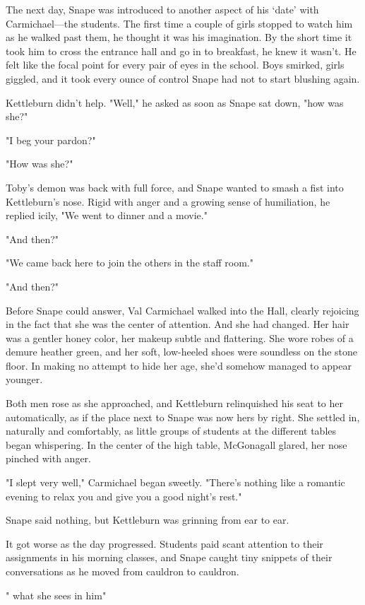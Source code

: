 The next day, Snape was introduced to another aspect of his `date' with Carmichael—the students. The first time a couple of girls stopped to watch him as he walked past them, he thought it was his imagination. By the short time it took him to cross the entrance hall and go in to breakfast, he knew it wasn't. He felt like the focal point for every pair of eyes in the school. Boys smirked, girls giggled, and it took every ounce of control Snape had not to start blushing again.

Kettleburn didn't help. "Well," he asked as soon as Snape sat down, "how was she?"

"I beg your pardon?"

"How was she?"

Toby's demon was back with full force, and Snape wanted to smash a fist into Kettleburn's nose. Rigid with anger and a growing sense of humiliation, he replied icily, "We went to dinner and a movie."

"And then?"

"We came back here to join the others in the staff room."

"And then?"

Before Snape could answer, Val Carmichael walked into the Hall, clearly rejoicing in the fact that she was the center of attention. And she had changed. Her hair was a gentler honey color, her makeup subtle and flattering. She wore robes of a demure heather green, and her soft, low-heeled shoes were soundless on the stone floor. In making no attempt to hide her age, she'd somehow managed to appear younger.

Both men rose as she approached, and Kettleburn relinquished his seat to her automatically, as if the place next to Snape was now hers by right. She settled in, naturally and comfortably, as little groups of students at the different tables began whispering. In the center of the high table, McGonagall glared, her nose pinched with anger.

"I slept very well," Carmichael began sweetly. "There's nothing like a romantic evening to relax you and give you a good night's rest."

Snape said nothing, but Kettleburn was grinning from ear to ear.

It got worse as the day progressed. Students paid scant attention to their assignments in his morning classes, and Snape caught tiny snippets of their conversations as he moved from cauldron to cauldron.

"{\el} what she sees in him{\el}"

